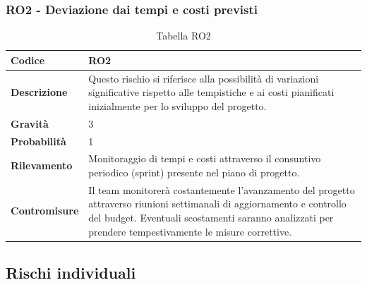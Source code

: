 \documentclass{article}
\begin{document}
    \subsubsection{RO2 - Deviazione dai tempi e costi previsti}
    \begin{table}[H]
        \renewcommand{\arraystretch}{1.5}
        \centering
        \begin{tabular}{|p{3cm}|p{11cm}|}
            \hline
            \textbf{Codice} & RO2 \\
            \hline
            \textbf{Descrizione} & Questo rischio si riferisce alla possibilità di variazioni significative rispetto alle tempistiche e ai costi pianificati inizialmente per lo sviluppo del progetto. \\
            \hline
            \textbf{Gravità} & 3 \\
            \hline
            \textbf{Probabilità} & 1 \\
            \hline
            \textbf{Rilevamento} & Monitoraggio di tempi e costi attraverso il consuntivo periodico (sprint) presente nel piano di progetto. \\
            \hline
            \textbf{Contromisure} & Il team monitorerà costantemente l’avanzamento del progetto attraverso riunioni settimanali di aggiornamento e controllo del budget. Eventuali scostamenti saranno analizzati per prendere tempestivamente le misure correttive. \\
            \hline
        \end{tabular}
        \caption{Tabella RO2}
    \end{table}

    \break
    \subsection{Rischi individuali}
\end{document}

